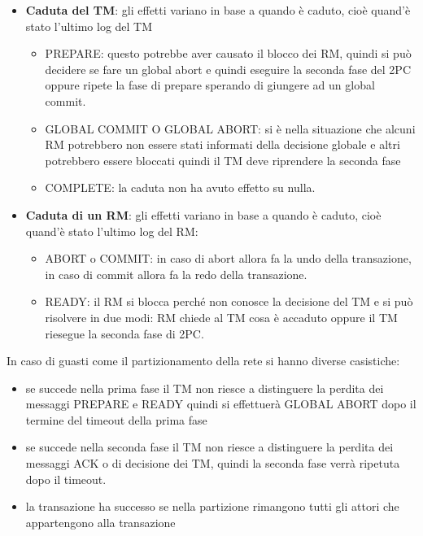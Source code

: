 \begin{itemize}
      \item \textbf{Caduta del TM}: gli effetti variano in base a quando è caduto,
            cioè quand'è stato l'ultimo log del TM
            \begin{itemize}
                  \item PREPARE: questo potrebbe aver causato il blocco dei RM,
                        quindi si può decidere se fare un global abort e quindi
                        eseguire la seconda fase del 2PC oppure ripete la fase
                        di prepare sperando di giungere ad un global commit.
                  \item GLOBAL COMMIT O GLOBAL ABORT: si è nella situazione che
                        alcuni RM potrebbero non essere stati informati della
                        decisione globale e altri potrebbero essere bloccati
                        quindi il TM deve riprendere la seconda fase
                  \item COMPLETE: la caduta non ha avuto effetto su nulla.
            \end{itemize}
      \item \textbf{Caduta di un RM}: gli effetti variano in base a quando è caduto,
            cioè quand'è stato l'ultimo log del RM:
            \begin{itemize}
                  \item ABORT o COMMIT: in caso di abort allora fa la undo della
                        transazione, in caso di commit allora fa la redo della
                        transazione.
                  \item READY: il RM si blocca perché non conosce la decisione
                        del TM e si può risolvere in due modi: RM chiede al TM
                        cosa è accaduto oppure il TM riesegue la seconda fase di
                        2PC.
            \end{itemize}
\end{itemize}

In caso di guasti come il partizionamento della rete si hanno diverse casistiche:
\begin{itemize}
      \item se succede nella prima fase il TM non riesce a distinguere la perdita
            dei messaggi PREPARE e READY quindi si effettuerà GLOBAL ABORT dopo
            il termine del timeout della prima fase
      \item se succede nella seconda fase il TM non riesce a distinguere la perdita
            dei messaggi ACK o di decisione dei TM, quindi la seconda fase verrà
            ripetuta dopo il timeout.
      \item la transazione ha successo se nella partizione rimangono tutti gli attori
            che appartengono alla transazione
\end{itemize}

